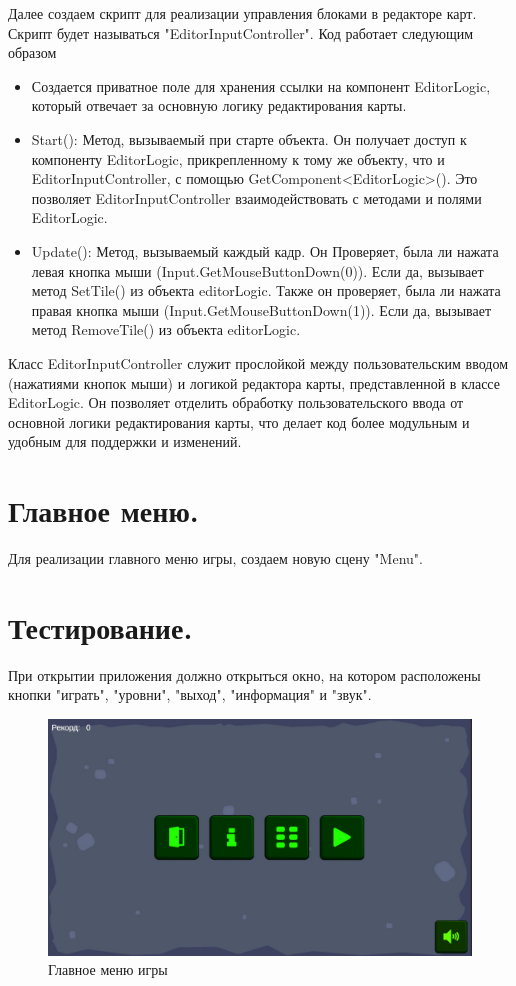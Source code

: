 Далее создаем скрипт для реализации управления блоками в редакторе карт. Скрипт будет называться "EditorInputController". Код работает следующим образом
\begin{itemize}
    \item Создается приватное поле для хранения ссылки на компонент EditorLogic, который отвечает за основную логику редактирования карты.
    \item Start(): Метод, вызываемый при старте объекта. Он получает доступ к компоненту EditorLogic, прикрепленному к тому же объекту, что и EditorInputController, с помощью GetComponent<EditorLogic>(). Это позволяет EditorInputController взаимодействовать с методами и полями EditorLogic.
    \item Update(): Метод, вызываемый каждый кадр. Он Проверяет, была ли нажата левая кнопка мыши (Input.GetMouseButtonDown(0)). Если да, вызывает метод SetTile() из объекта editorLogic. Также он проверяет, была ли нажата правая кнопка мыши (Input.GetMouseButtonDown(1)). Если да, вызывает метод RemoveTile() из объекта editorLogic.
\end{itemize}
Класс EditorInputController служит прослойкой между пользовательским вводом (нажатиями кнопок мыши) и логикой редактора карты, представленной в классе EditorLogic. Он позволяет отделить обработку пользовательского ввода от основной логики редактирования карты, что делает код более модульным и удобным для поддержки и изменений.

\section{Главное меню.}
Для реализации главного меню игры, создаем новую сцену "Menu".
\section{Тестирование.}
При открытии приложения должно открыться окно, на котором расположены кнопки "играть", "уровни", "выход", "информация" и "звук".

\begin{figure}[h]
\centering
\includegraphics[width=0.8\linewidth]{images/menu.jpg}
\caption{Главное меню игры}
\label{fig:mpr}
\end{figure}

